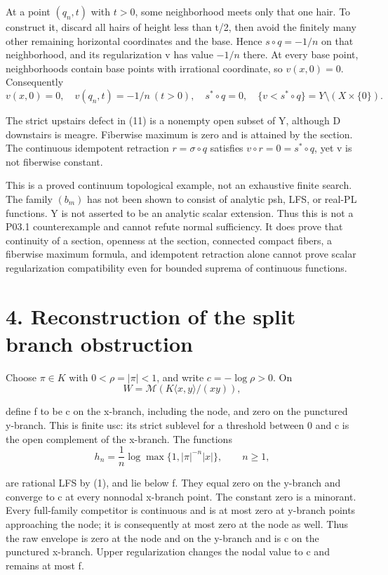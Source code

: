 \documentclass[11pt,a4paper]{article}
\begin{document}
At a point \((q_n,t)\) with \(t>0\), some neighborhood meets only that one hair. To construct it, discard all hairs of height less than t/2, then avoid the finitely many other remaining horizontal coordinates and the base. Hence \(s\circ q=-1/n\) on that neighborhood, and its regularization v has value \(-1/n\) there. At every base point, neighborhoods contain base points with irrational coordinate, so \(v(x,0)=0\). Consequently
\[
v(x,0)=0,\quad v(q_n,t)=-1/n\ (t>0),\quad
s^*\circ q=0,\quad
\{v<s^*\circ q\}=Y\setminus(X\times\{0\}).
\tag{11}
\]

The strict upstairs defect in (11) is a nonempty open subset of Y, although D downstairs is meagre. Fiberwise maximum is zero and is attained by the section. The continuous idempotent retraction \(r=\sigma\circ q\) satisfies \(v\circ r=0=s^*\circ q\), yet v is not fiberwise constant.

This is a proved continuum topological example, not an exhaustive finite search. The family \((b_m)\) has not been shown to consist of analytic psh, LFS, or real-PL functions. Y is not asserted to be an analytic scalar extension. Thus this is not a P03.1 counterexample and cannot refute normal sufficiency. It does prove that continuity of a section, openness at the section, connected compact fibers, a fiberwise maximum formula, and idempotent retraction alone cannot prove scalar regularization compatibility even for bounded suprema of continuous functions.

\section*{4. Reconstruction of the split branch obstruction}

Choose \(\pi\in K\) with \(0<\rho=|\pi|<1\), and write \(c=-\log\rho>0\). On
\[
W=\mathcal M(K\langle x,y\rangle/(xy)),
\]

define f to be c on the x-branch, including the node, and zero on the punctured y-branch. This is finite usc: its strict sublevel for a threshold between 0 and c is the open complement of the x-branch. The functions
\[
h_n=\frac1n\log\max\{1,|\pi|^{-n}|x|\},\qquad n\geq1,
\tag{12}
\]

are rational LFS by (1), and lie below f. They equal zero on the y-branch and converge to c at every nonnodal x-branch point. The constant zero is a minorant. Every full-family competitor is continuous and is at most zero at y-branch points approaching the node; it is consequently at most zero at the node as well. Thus the raw envelope is zero at the node and on the y-branch and is c on the punctured x-branch. Upper regularization changes the nodal value to c and remains at most f.
\end{document}

